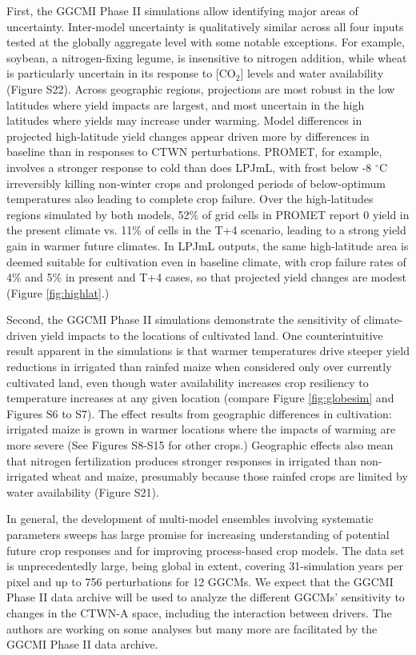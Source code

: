 \documentclass[gmd, manuscript]{copernicus} %
\begin{document}
First, the GGCMI Phase II simulations allow identifying major areas of uncertainty. 
Inter-model uncertainty is qualitatively similar across all four inputs tested at the globally aggregate level with some notable exceptions. 
For example, soybean, a nitrogen-fixing legume, is insensitive to nitrogen addition, while wheat is particularly uncertain in its response to [CO$_2$] levels and water availability (Figure S22). 
Across geographic regions, projections are most robust in the low latitudes where yield impacts are largest, and most uncertain in the high latitudes where yields may increase under warming. 
Model differences in projected high-latitude yield changes appear driven more by differences in baseline than in responses to CTWN perturbations.  
PROMET, for example, involves a stronger response to cold than does LPJmL, with frost below -8 $^\circ$C irreversibly killing non-winter crops and prolonged periods of below-optimum temperatures also leading to complete crop failure. 
Over the high-latitudes regions simulated by both models, 52\% of grid cells in PROMET report 0 yield in the present climate vs. 11\% of cells in the T+4 scenario, leading to a strong yield gain in warmer future climates. 
In LPJmL outputs, the same high-latitude area is deemed suitable for cultivation even in baseline climate, with crop failure rates of 4\% and 5\% in present and T+4 cases, so that projected yield changes are modest (Figure \ref{fig:highlat}.)

Second, the GGCMI Phase II simulations demonstrate the sensitivity of climate-driven yield impacts to the locations of cultivated land. 
One counterintuitive result apparent in the simulations is that warmer temperatures drive steeper yield reductions in irrigated than rainfed maize when considered only over currently cultivated land, even though water availability increases crop resiliency to temperature increases at any given location (compare Figure \ref{fig:globesim} and Figures S6 to S7). 
The effect results from geographic differences in cultivation: irrigated maize is grown in warmer locations where the impacts of warming are more severe (See Figures S8-S15 for other crops.) 
Geographic effects also mean that nitrogen fertilization produces stronger responses in irrigated than non-irrigated wheat and maize, presumably because those rainfed crops are limited by water availability (Figure S21).

In general, the development of multi-model ensembles involving systematic parameters sweeps has large promise for increasing understanding of potential future crop responses and for improving process-based crop models.
The data set is unprecedentedly large, being global in extent, covering 31-simulation years per pixel and up to 756 perturbations for 12 GGCMs.
We expect that the GGCMI Phase II data archive will be used to analyze the different GGCMs' sensitivity to changes in the CTWN-A space, including the interaction between drivers.
The authors are working on some analyses but many more are facilitated by the GGCMI Phase II data archive. 
\end{document}
